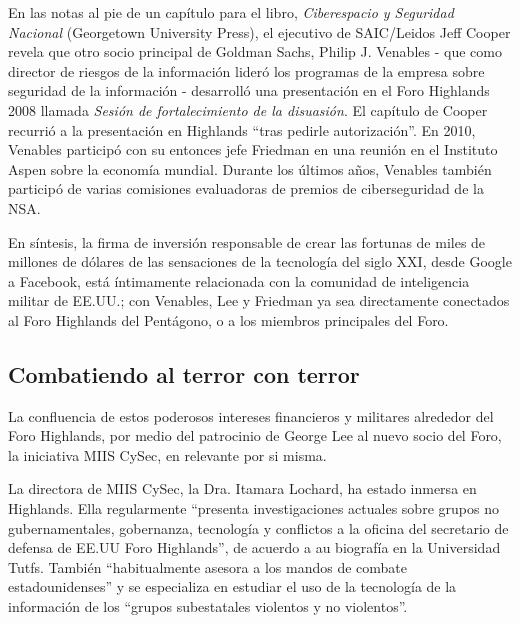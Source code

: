 \documentclass[10pt,a5paper,twoside,spanish,]{book}
\begin{document}
En las notas al pie de un capítulo para el libro, \emph{Ciberespacio y
Seguridad Nacional} (Georgetown University Press), el ejecutivo de
SAIC/Leidos Jeff Cooper revela que otro socio principal de Goldman
Sachs, Philip J. Venables - que como director de riesgos de la
información lideró los programas de la empresa sobre seguridad de la
información - desarrolló una presentación en el Foro Highlands 2008
llamada \emph{Sesión de fortalecimiento de la disuasión}. El capítulo de
Cooper recurrió a la presentación en Highlands ``tras pedirle
autorización''. En 2010, Venables participó con su entonces jefe
Friedman en una reunión en el Instituto Aspen sobre la economía mundial.
Durante los últimos años, Venables también participó de varias
comisiones evaluadoras de premios de ciberseguridad de la NSA.

En síntesis, la firma de inversión responsable de crear las fortunas de
miles de millones de dólares de las sensaciones de la tecnología del
siglo XXI, desde Google a Facebook, está íntimamente relacionada con la
comunidad de inteligencia militar de EE.UU.; con Venables, Lee y
Friedman ya sea directamente conectados al Foro Highlands del Pentágono,
o a los miembros principales del Foro.

\subsection{Combatiendo al terror con
terror}\label{combatiendo-al-terror-con-terror}

La confluencia de estos poderosos intereses financieros y militares
alrededor del Foro Highlands, por medio del patrocinio de George Lee al
nuevo socio del Foro, la iniciativa MIIS CySec, en relevante por si
misma.

La directora de MIIS CySec, la Dra. Itamara Lochard, ha estado inmersa
en Highlands. Ella regularmente ``presenta investigaciones actuales
sobre grupos no gubernamentales, gobernanza, tecnología y conflictos a
la oficina del secretario de defensa de EE.UU Foro Highlands'', de
acuerdo a au biografía en la Universidad Tutfs. También ``habitualmente
asesora a los mandos de combate estadounidenses'' y se especializa en
estudiar el uso de la tecnología de la información de los ``grupos
subestatales violentos y no violentos''.
\end{document}
